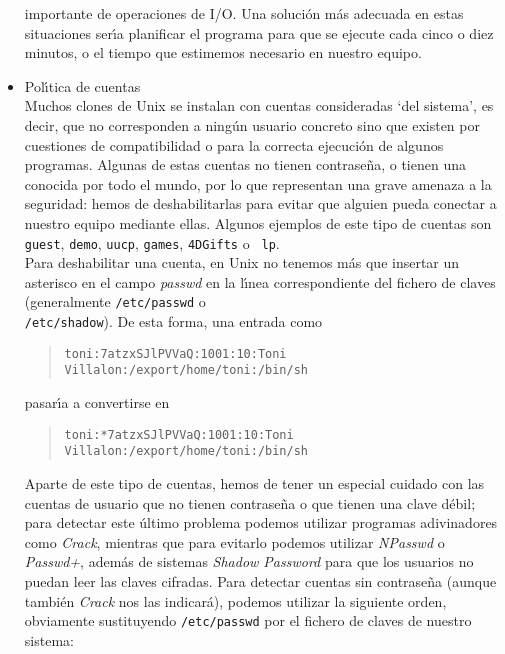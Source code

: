 \begin{itemize}
importante de operaciones de I/O. Una soluci\'on m\'as adecuada en estas 
situaciones ser\'{\i}a planificar el programa para que se ejecute cada cinco o
diez minutos, o el tiempo que estimemos necesario en nuestro equipo. 
\item Pol\'{\i}tica de cuentas\\
Muchos clones de Unix se instalan con cuentas consideradas `del sistema', es
decir, que no corresponden a ning\'un usuario concreto sino que existen por
cuestiones de compatibilidad o para la correcta ejecuci\'on de algunos 
programas. Algunas de estas cuentas no tienen contrase\~na, o tienen una
conocida por todo el mundo, por lo que representan una grave amenaza a la 
seguridad: hemos de deshabilitarlas para evitar que alguien pueda conectar
a nuestro equipo mediante ellas. Algunos ejemplos de este tipo de cuentas
son {\tt guest}, {\tt demo}, {\tt uucp}, {\tt games}, {\tt 4DGifts} o {\tt 
lp}.\\
Para deshabilitar una cuenta, en Unix no tenemos m\'as que insertar un asterisco
en el campo {\it passwd} en la l\'{\i}nea correspondiente del fichero de claves 
(generalmente {\tt /etc/passwd} o\\ {\tt /etc/shadow}). De esta forma, una 
entrada como 
\tt
\begin{quote}
\begin{verbatim}
toni:7atzxSJlPVVaQ:1001:10:Toni Villalon:/export/home/toni:/bin/sh
\end{verbatim}
\end{quote}
\rm
pasar\'{\i}a a convertirse en 
\tt
\begin{quote}
\begin{verbatim}
toni:*7atzxSJlPVVaQ:1001:10:Toni Villalon:/export/home/toni:/bin/sh
\end{verbatim}
\end{quote}
\rm
Aparte de este tipo de cuentas, hemos de tener un especial cuidado con las 
cuentas de usuario que no tienen contrase\~na o que tienen una clave d\'ebil;
para detectar este \'ultimo problema podemos utilizar programas adivinadores 
como {\it Crack}, mientras que para evitarlo podemos utilizar {\it NPasswd} o
{\it Passwd+}, adem\'as de sistemas {\it Shadow Password} para que los usuarios
no puedan leer las claves cifradas. Para detectar cuentas sin contrase\~na 
(aunque tambi\'en {\it Crack} nos
las indicar\'a), podemos utilizar la siguiente orden, obviamente sustituyendo
{\tt /etc/passwd} por el fichero de claves de nuestro sistema:
\tt
\begin{quote}
\begin{verbatim}

\end{verbatim}
\end{quote}
\end{itemize}
